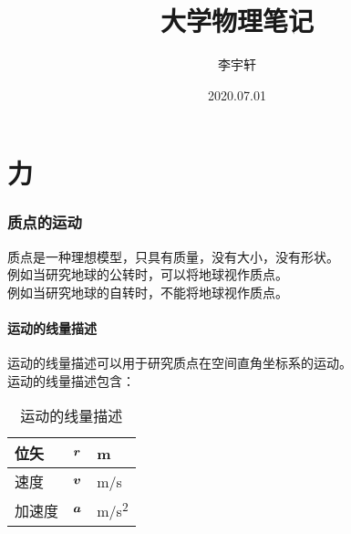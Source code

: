 \documentclass[UTF8]{ctexart}
\title{大学物理笔记}
\author{李宇轩}
\date{2020.07.01}
\newcommand*{\veb}[1]{\vb*{#1}}
\begin{document}

\maketitle

\newpage

\tableofcontents

\setlength{\parindent}{0pt}

\newpage

\part{力}

\newpage

\section{质点的运动}
    质点是一种理想模型，只具有质量，没有大小，没有形状。\\[3mm]
    例如当研究地球的公转时，可以将地球视作质点。\\[3mm]
    例如当研究地球的自转时，不能将地球视作质点。

\subsection{运动的线量描述}
    运动的线量描述可以用于研究质点在空间直角坐标系的运动。\\[3mm]
    运动的线量描述包含：
    \begin{table}[h]
        \begin{center}
            \begin{tabular}{p{60pt}|p{60 pt}|p{60 pt}}
                \hline
                位矢&$\veb{r}$&\si{m}\\ \hline
                速度&$\veb{v}$&\si{m/s}\\ \hline
                加速度&$\veb{a}$&\si{m/s^2}\\ \hline
            \end{tabular}
            \caption{运动的线量描述}
        \end{center}
    \end{table}\vspace{-25pt}
\end{document}
